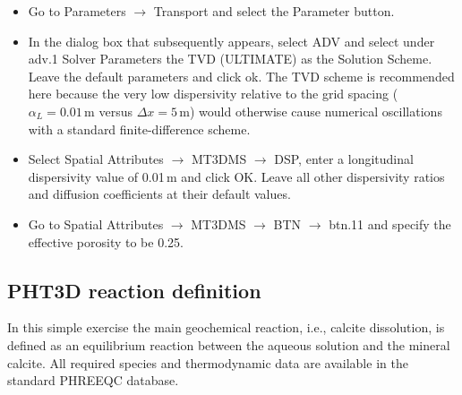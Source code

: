 \begin{itemize}

\item Go to {\color{blue}Parameters} $\rightarrow$
{\color{blue}Transport} and select the {\color{blue}Parameter} button.

\item In the dialog box that subsequently appears, select
{\color{blue}ADV} and select under {\color{blue}adv.1 Solver Parameters}
the {\color{blue}TVD} (ULTIMATE) as the Solution Scheme.
Leave the default parameters and click {\color{blue}ok}.
The TVD scheme is recommended here because the very low dispersivity
relative to the grid spacing ($\alpha_L = 0.01\,\mathrm{m}$ versus
$\Delta x = 5\,\mathrm{m}$) would otherwise cause numerical oscillations
with a standard finite-difference scheme.

\item Select {\color{blue}Spatial Attributes} $\rightarrow$
{\color{blue}MT3DMS} $\rightarrow$
{\color{blue}DSP},
enter a longitudinal dispersivity value of 0.01\,m and click
{\color{blue}OK}.
Leave all other dispersivity ratios and diffusion coefficients at
their default values.

\item Go to {\color{blue}Spatial Attributes} $\rightarrow$
{\color{blue}MT3DMS} $\rightarrow$
{\color{blue}BTN} $\rightarrow$
{\color{blue}btn.11}
and specify the effective porosity to be 0.25.

\end{itemize}

\subsection[PHT3D reaction definition]{PHT3D reaction definition}

In this simple exercise the main geochemical reaction, i.e., calcite dissolution, is defined as an equilibrium reaction between the aqueous solution and the mineral calcite. All required species and thermodynamic data are available in the standard PHREEQC database.

